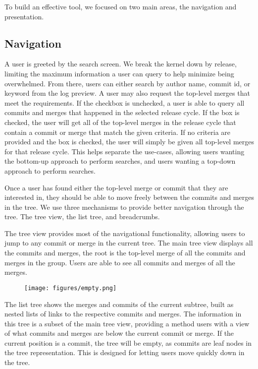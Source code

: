\documentclass[conference, draftclsnofoot]{IEEEtran}
\begin{document}
To build an effective tool, we focused on two main areas, the navigation
and presentation.


\subsection{Navigation}

A user is greeted by the search screen. We break the kernel down by release,
limiting the maximum information a user can query to help minimize being
overwhelmed. From there, users can either search by author name, commit id, or
keyword from the log preview. A user may also request the top-level merges that
meet the requirements. If the checkbox is unchecked, a user is able to query
all commits and merges that happened in the selected release cycle. If the box
is checked, the user will get all of the top-level merges in the release cycle
that contain a commit or merge that match the given criteria. If no criteria
are provided and the box is checked, the user will simply be given all
top-level merges for that release cycle. This helps separate the use-cases,
allowing users wanting the bottom-up approach to perform searches, and users
wanting a top-down approach to perform searches.

Once a user has found either the top-level merge or commit that they are
interested in, they should be able to move freely between the commits and
merges in the tree. We use three mechanisms to provide better navigation
through the tree. The tree view, the list tree, and breadcrumbs.

The tree view provides most of the
navigational functionality, allowing users to jump to any commit or merge in
the current tree. The main tree view displays all the commits and merges, the
root is the top-level merge of all the commits and merges in the group. Users
are able to see all commits and merges of all the merges.

\begin{figure}[h!]
	\centering
	\texttt{[image: figures/empty.png]}
	\caption{}
	\label{}
\end{figure}

The list tree shows the merges and commits of the current subtree, built as
nested lists of links to the respective commits and merges. The information in
this tree is a subset of the main tree view, providing a method users with a
view of what commits and merges are below the current commit or merge. If the
current position is a commit, the tree will be empty, as commits are leaf
nodes in the tree representation. This is designed for letting users move
quickly down in the tree.
\end{document}
